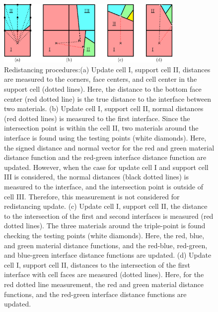 \documentclass[]{article}
\begin{document}
\begin{figure}[htbp]
  \centering
  \includegraphics[width=0.8\textwidth]{redistancing.eps}
  \caption{Redistancing procedures:(a) Update cell I, support cell II, distances are measured to the corners, face centers, and cell center in the support cell (dotted lines). Here, the distance to the bottom face center (red dotted line) is the true distance to the interface between two materials. (b) Update cell I, support cell II, normal distances (red dotted lines) is measured to the first interface. Since the intersection point is within the cell II, two materials around the interface is found using the testing points (white diamonds). Here, the signed distance and normal vector for the red and green material distance function and the red-green interface distance function are updated. However, when the case for update cell I and support cell III is considered, the normal distances (black dotted lines) is measured to the interface, and the intersection point is outside of cell III. Therefore, this measurement is not considered for redistancing update. (c) Update cell I, support cell II, the distance to the intersection of the first and second interfaces is measured (red dotted lines). The three materials around the triple-point is found checking the testing points (white diamonds). Here, the red, blue, and green material distance functions, and the red-blue, red-green, and blue-green interface distance functions are updated. (d) Update cell I, support cell II, distances to the intersection of the first interface with cell faces are measured (dotted lines). Here, for the red dotted line measurement, the red and green material distance functions, and the red-green interface distance functions are updated.}
  \label{fig:redistancing}
\end{figure}
\end{document}
